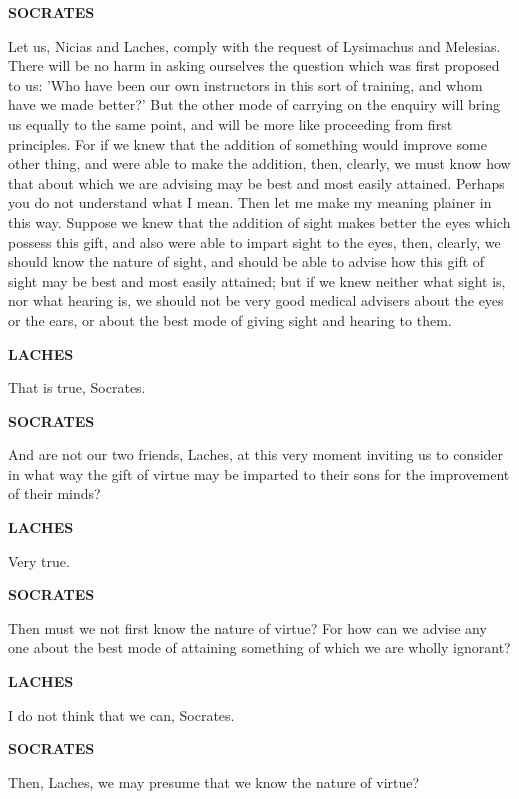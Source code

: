 \documentclass[11pt,letter]{book}
\begin{document}
\par \textbf{SOCRATES}
\par   Let us, Nicias and Laches, comply with the request of Lysimachus and Melesias. There will be no harm in asking ourselves the question which was first proposed to us:  'Who have been our own instructors in this sort of training, and whom have we made better?' But the other mode of carrying on the enquiry will bring us equally to the same point, and will be more like proceeding from first principles. For if we knew that the addition of something would improve some other thing, and were able to make the addition, then, clearly, we must know how that about which we are advising may be best and most easily attained. Perhaps you do not understand what I mean. Then let me make my meaning plainer in this way. Suppose we knew that the addition of sight makes better the eyes which possess this gift, and also were able to impart sight to the eyes, then, clearly, we should know the nature of sight, and should be able to advise how this gift of sight may be best and most easily attained; but if we knew neither what sight is, nor what hearing is, we should not be very good medical advisers about the eyes or the ears, or about the best mode of giving sight and hearing to them.

\par \textbf{LACHES}
\par   That is true, Socrates.

\par \textbf{SOCRATES}
\par   And are not our two friends, Laches, at this very moment inviting us to consider in what way the gift of virtue may be imparted to their sons for the improvement of their minds?

\par \textbf{LACHES}
\par   Very true.

\par \textbf{SOCRATES}
\par   Then must we not first know the nature of virtue? For how can we advise any one about the best mode of attaining something of which we are wholly ignorant?

\par \textbf{LACHES}
\par   I do not think that we can, Socrates.

\par \textbf{SOCRATES}
\par   Then, Laches, we may presume that we know the nature of virtue?
\end{document}
